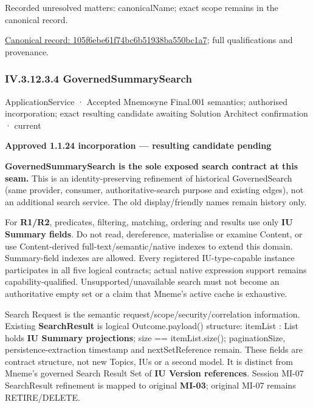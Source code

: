 {\small Recorded unresolved matters: canonicalName; exact scope remains in the canonical record.}\par
{\footnotesize \href{../../../../continuum/application/application-service/105f6ebe61f74bc6b51938ba550bc1a7.md}{Canonical record: 105f6ebe61f74bc6b51938ba550bc1a7}; full qualifications and provenance.}\par
\subsubsection*{IV.3.12.3.4 GovernedSummarySearch}
\label{navigation:IV.3.12.3.4}

\label{element:dcb31810ae134818adeeba9b27bd2f30}
{\small ApplicationService · Accepted Mnemosyne Final.001 semantics; authorised incorporation; exact resulting candidate awaiting Solution Architect confirmation · current}\par

\par\medskip\textbf{Approved 1.1.24 incorporation — resulting candidate pending}\par


\textbf{GovernedSummarySearch is the sole exposed search contract at this seam.} This is an identity-preserving refinement of historical GovernedSearch (same provider, consumer, authoritative-search purpose and existing edges), not an additional search service. The old display/friendly names remain history only.



For \textbf{R1/R2}, predicates, filtering, matching, ordering and results use only \textbf{IU Summary fields}. Do not read, dereference, materialise or examine Content, or use Content-derived full-text/semantic/native indexes to extend this domain. Summary-field indexes are allowed. Every registered IU-type-capable instance participates in all five logical contracts; actual native expression support remains capability-qualified. Unsupported/unavailable search must not become an authoritative empty set or a claim that Mneme's active cache is exhaustive.



Search Request is the semantic request/scope/security/correlation information. Existing \textbf{SearchResult} is logical Outcome.payload() structure: itemList : List holds \textbf{IU Summary projections}; size == itemList.size(); paginationSize, persistence-extraction timestamp and nextSetReference remain. These fields are contract structure, not new Topics, IUs or a second model. It is distinct from Mneme's governed Search Result Set of \textbf{IU Version references}. Session MI-07 SearchResult refinement is mapped to original \textbf{MI-03}; original MI-07 remains RETIRE/DELETE.



